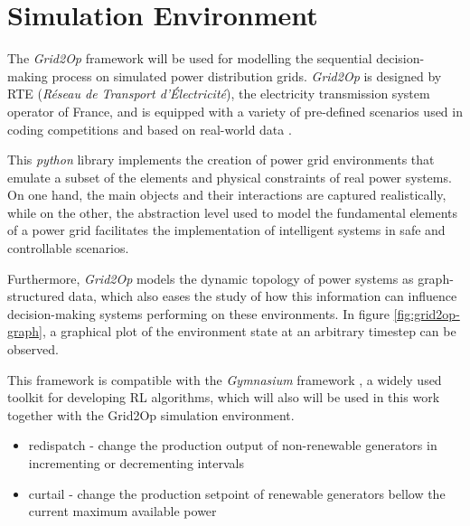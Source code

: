 \section{Simulation Environment} \label{sec:simulation-env}

The \textit{Grid2Op} framework \cite{rtefranceGrid2OpDocumentation} will be used for modelling the sequential decision-making process on simulated power distribution grids. \textit{Grid2Op} is designed by RTE (\textit{Réseau de Transport d'Électricité}), the electricity transmission system operator of France, and is equipped with a variety of pre-defined scenarios used in coding competitions and based on real-world data \cite{rtefranceGrid2OpDocumentation}. \par
This \textit{python} library implements the creation of power grid environments that emulate a subset of the elements and physical constraints of real power systems. On one hand, the main objects and their interactions are captured realistically, while on the other, the abstraction level used to model the fundamental elements of a power grid facilitates the implementation of intelligent systems in safe and controllable scenarios. \par
Furthermore, \textit{Grid2Op} models the dynamic topology of power systems as graph-structured data, which also eases the study of how this information can influence decision-making systems performing on these environments.  In figure \ref{fig:grid2op-graph}, a graphical plot of the environment state at an arbitrary timestep can be observed. \par
This framework is compatible with the \textit{Gymnasium} framework \cite{faramafoundationGymnasiumDocumentation}, a widely used toolkit for developing \ac{RL} algorithms, which will also will be used in this work together with the Grid2Op simulation environment. 

\begin{itemize}
	\item redispatch - change the production output of non-renewable generators in incrementing or decrementing intervals 
	\item curtail - change the production setpoint of renewable generators bellow the current maximum available power \cite{rtefranceGrid2OpDocumentation}
\end{itemize}



